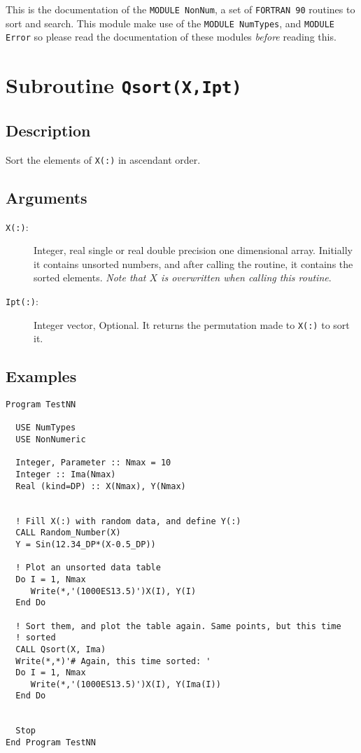 This is the documentation of the \texttt{MODULE NonNum}, a set
of \texttt{FORTRAN 90} routines to sort and search. This module make
use of the \texttt{MODULE NumTypes}, and \texttt{MODULE Error} so
please read the documentation of these modules \emph{before} reading
this. 

\section{Subroutine \texttt{Qsort(X,Ipt)}}

\subsection{Description}

Sort the elements of \texttt{X(:)} in ascendant order.

\subsection{Arguments}

\begin{description}
\item[\texttt{X(:)}: ] Integer, real single or real double precision one
  dimensional array. Initially it contains unsorted numbers, and after
  calling the routine, it contains the sorted elements. \emph{Note that
    $X$ is overwritten when calling this routine}. 
\item[\texttt{Ipt(:)}: ] Integer vector, Optional. It returns the
  permutation made to \texttt{X(:)} to sort it.
\end{description}

\subsection{Examples}

\begin{verbatim}
Program TestNN

  USE NumTypes
  USE NonNumeric

  Integer, Parameter :: Nmax = 10
  Integer :: Ima(Nmax)
  Real (kind=DP) :: X(Nmax), Y(Nmax)


  ! Fill X(:) with random data, and define Y(:)
  CALL Random_Number(X)
  Y = Sin(12.34_DP*(X-0.5_DP))

  ! Plot an unsorted data table
  Do I = 1, Nmax
     Write(*,'(1000ES13.5)')X(I), Y(I)
  End Do

  ! Sort them, and plot the table again. Same points, but this time
  ! sorted 
  CALL Qsort(X, Ima)
  Write(*,*)'# Again, this time sorted: '
  Do I = 1, Nmax
     Write(*,'(1000ES13.5)')X(I), Y(Ima(I))
  End Do


  Stop
End Program TestNN
\end{verbatim}


